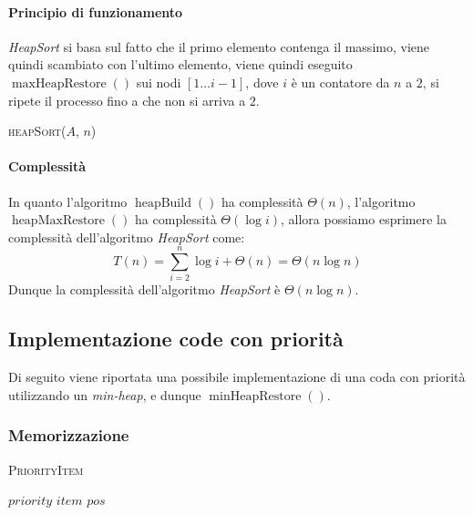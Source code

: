             \paragraph{Principio di funzionamento} \textit{HeapSort} si basa sul fatto che il primo elemento contenga il massimo, viene quindi scambiato con l'ultimo elemento, viene quindi eseguito $\operatorname{maxHeapRestore}()$ sui nodi $[1\dots i-1]$, dove $i$ è un contatore da $n$ a $2$, si ripete il processo fino a che non si arriva a $2$.
            \begin{algorithm}
                \caption{\textsc{heapSort}(\Item[] $A$, \Int $n$)}
                \begin{algorithmic}
                    \State {}
                        \State {}
                        \State {}
                    \EndFor
                \end{algorithmic}
            \end{algorithm}
            \paragraph{Complessità} In quanto l'algoritmo $\operatorname{heapBuild}()$ ha complessità $\Theta(n)$, l'algoritmo $\operatorname{heapMaxRestore}()$ ha complessità $\Theta(\log i)$, allora possiamo esprimere la complessità dell'algoritmo \textit{HeapSort} come: $$
                T(n)=\sum_{i=2}^{n}\log i+\Theta(n)=\Theta(n\log n)
            $$
            Dunque la complessità dell'algoritmo \textit{HeapSort} è $\Theta(n\log n)$.
    \newpage
    \subsection{Implementazione code con priorità}
        Di seguito viene riportata una possibile implementazione di una coda con priorità utilizzando un \textit{min-heap}, e dunque $\operatorname{minHeapRestore}()$.
        \subsubsection{Memorizzazione}
            
            \begin{algorithm}[H]
                \caption{\textsc{PriorityItem}}
                \begin{algorithmic}
                    \State \Int $priority$ 
                    \State \Item $item$ 
                    \State \Int $pos$ 
                \end{algorithmic}
            \end{algorithm}

